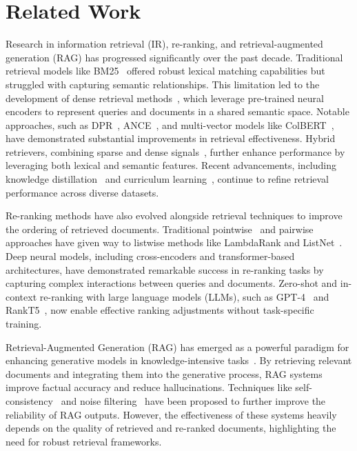 \section{Related Work}
\label{s:related_work}
Research in information retrieval (IR), re-ranking, and retrieval-augmented generation (RAG) has progressed significantly over the past decade. Traditional retrieval models like BM25~\cite{bm25} offered robust lexical matching capabilities but struggled with capturing semantic relationships. This limitation led to the development of dense retrieval methods~\cite{lee-etal-2019-latent}, which leverage pre-trained neural encoders to represent queries and documents in a shared semantic space. Notable approaches, such as DPR~\cite{dpr}, ANCE~\cite{ance}, and multi-vector models like ColBERT~\cite{khattab2020colbertefficienteffectivepassage}, have demonstrated substantial improvements in retrieval effectiveness. Hybrid retrievers, combining sparse and dense signals~\cite{DBLP:conf/ecir/GaoDCFDC21,ma2021replication}, further enhance performance by leveraging both lexical and semantic features. Recent advancements, including knowledge distillation~\cite{qu-etal-2021-rocketqa} and curriculum learning~\cite{cldrd}, continue to refine retrieval performance across diverse datasets.

Re-ranking methods have also evolved alongside retrieval techniques to improve the ordering of retrieved documents. Traditional pointwise~\cite{zhu2021leveraging} and pairwise~\cite{cao2007learning} approaches have given way to listwise methods like LambdaRank and ListNet~\cite{burges2010ranknet,liu2017listnet}. Deep neural models, including cross-encoders and transformer-based architectures, have demonstrated remarkable success in re-ranking tasks by capturing complex interactions between queries and documents. Zero-shot and in-context re-ranking with large language models (LLMs), such as GPT-4~\cite{achiam2023gpt} and RankT5~\cite{zhuang2023rankt5}, now enable effective ranking adjustments without task-specific training.

Retrieval-Augmented Generation (RAG) has emerged as a powerful paradigm for enhancing generative models in knowledge-intensive tasks~\cite{lewis2020retrieval}. By retrieving relevant documents and integrating them into the generative process, RAG systems improve factual accuracy and reduce hallucinations. Techniques like self-consistency~\cite{wang2022self} and noise filtering~\cite{fang2024enhancing} have been proposed to further improve the reliability of RAG outputs. However, the effectiveness of these systems heavily depends on the quality of retrieved and re-ranked documents, highlighting the need for robust retrieval frameworks.

